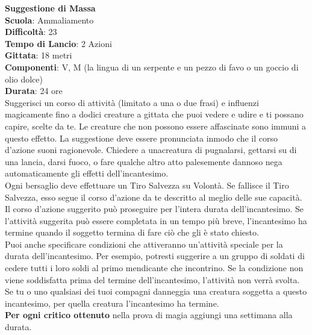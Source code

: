 \begin{multicols}{2}
\medskip\textbf{Suggestione di Massa}\\
\textbf{Scuola}: Ammaliamento\\
\textbf{Difficoltà}:  23\\
\textbf{Tempo di Lancio}: 2 Azioni\\
\textbf{Gittata}: 18 metri\\
\textbf{Componenti}: V, M (la lingua di un serpente e un pezzo di favo o un goccio di olio dolce)\\
\textbf{Durata}: 24 ore\\
Suggerisci un corso di attività (limitato a una o due frasi) e influenzi magicamente fino a dodici creature a gittata che puoi vedere e udire e ti possano capire, scelte da te. Le creature che non possono essere affascinate sono immuni a questo effetto. La suggestione deve essere pronunciata inmodo che il  corso d’azione suoni ragionevole. Chiedere a unacreatura di pugnalarsi, gettarsi su  di una lancia, darsi fuoco, o fare qualche altro atto palesemente dannoso nega automaticamente gli effetti dell'incantesimo.\\
Ogni bersaglio deve effettuare un Tiro Salvezza su Volontà. Se fallisce il Tiro Salvezza, esso segue il corso d’azione da te descritto al meglio delle sue capacità. Il corso d’azione suggerito può proseguire per l’intera durata dell'incantesimo. Se l’attività suggerita può essere completata in un tempo più breve, l'incantesimo ha termine quando il soggetto termina di fare ciò che gli è stato chiesto.\\
Puoi anche specificare condizioni che attiveranno un'attività speciale per la durata dell'incantesimo. Per esempio, potresti suggerire a un gruppo di soldati di cedere tutti i loro soldi al primo mendicante che incontrino. Se la condizione non viene soddisfatta prima del termine dell'incantesimo, l’attività non verrà svolta. Se tu o uno qualsiasi dei tuoi compagni danneggia una creatura soggetta a questo incantesimo, per quella creatura l'incantesimo ha termine.\\
\textbf{Per ogni critico ottenuto} nella prova di magia aggiungi una settimana alla durata.


\end{multicols}
